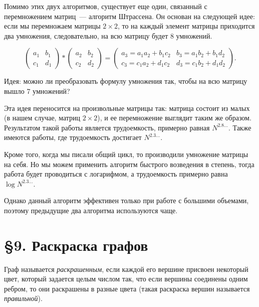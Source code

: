 \documentclass[russian]{lecture-notes}
\begin{document}
    Помимо этих двух алгоритмов, существует еще один, связанный с перемножением матриц~--- алгоритм Штрассена. Он основан на следующей идее: если мы перемножаем матрицы $2\times2$, то на каждый элемент матрицы приходится два умножения, следовательно, на всю матрицу будет 8 умножений.

    \[
        \begin{pmatrix}
            a_1 & b_1 \\
            c_1 & d_1
        \end{pmatrix}   *
        \begin{pmatrix}
            a_2 & b_2 \\
            c_2 & d_2
        \end{pmatrix} =
        \begin{pmatrix}
            a_3=a_1a_2+b_1c_2 & b_3=a_1b_2+b_1d_2 \\
            c_3=c_1a_2+d_1c_2 & d_3=c_1b_2+d_1d_2
        \end{pmatrix}.
    \]

    Идея: можно ли преобразовать формулу умножения так, чтобы на всю матрицу вышло 7 умножений?

    Эта идея переносится на произвольные матрицы так: матрица состоит из малых (в нашем случае, матриц $2\times2$), и ее перемножение выглядит таким же образом. Результатом такой работы является трудоемкость, примерно равная $N^{2.8\ldots}$. Также имеются работы, где трудоемкость достигает $N^{2.3\ldots}$.

    Кроме того, когда мы писали общий цикл, то производили умножение матрицы на себя. Но мы можем применить алгоритм быстрого возведения в степень, тогда работа будет проводиться с логарифмом, а трудоемкость примерно равна $\log N^{2.3\ldots}$.

    Однако данный алгоритм эффективен только при работе с большими объемами, поэтому предыдущие два алгоритма используются чаще.

    \section*{\S9. Раскраска графов}

    \normalsize
    \begin{definition}
        Граф называется {\em раскрашенным}, если каждой его вершине присвоен некоторый цвет, который задается целым числом так, что если вершины соединены одним ребром, то они раскрашены в разные цвета (такая раскраска вершин называется {\em правильной}).
    \end{definition}
\end{document}

